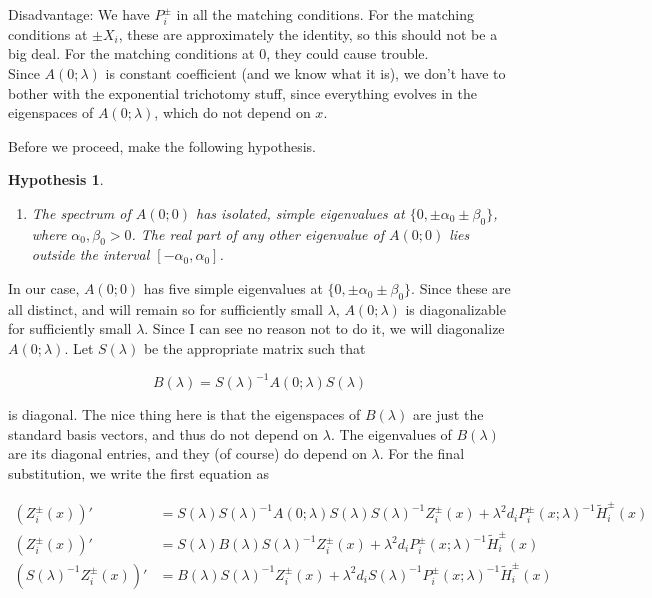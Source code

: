 \documentclass[12pt]{article}
\newtheorem{hypothesis}{Hypothesis}
\begin{document}
Disadvantage: We have $P_i^\pm$ in all the matching conditions. For the matching conditions at $\pm X_i$, these are approximately the identity, so this should not be a big deal. For the matching conditions at 0, they could cause trouble.\\

Since $A(0; \lambda)$ is constant coefficient (and we know what it is), we don't have to bother with the exponential trichotomy stuff, since everything evolves in the eigenspaces of $A(0; \lambda)$, which do not depend on $x$.

Before we proceed, make the following hypothesis.

\begin{hypothesis}\label{Aspectrumhyp}
\begin{enumerate}
	\item The spectrum of $A(0; 0)$ has isolated, simple eigenvalues at $\{ 0, \pm \alpha_0 \pm \beta_0 \}$, where $\alpha_0, \beta_0 > 0$. The real part of any other eigenvalue of $A(0; 0)$ lies outside the interval $[-\alpha_0, \alpha_0]$.
\end{enumerate}
\end{hypothesis}

In our case, $A(0; 0)$ has five simple eigenvalues at $\{ 0, \pm \alpha_0 \pm \beta_0 \}$. Since these are all distinct, and will remain so for sufficiently small $\lambda$, $A(0; \lambda)$ is diagonalizable for sufficiently small $\lambda$. Since I can see no reason not to do it, we will diagonalize $A(0; \lambda)$. Let $S(\lambda)$ be the appropriate matrix such that

\[
B(\lambda) = S(\lambda)^{-1} A(0; \lambda)S(\lambda)
\]

is diagonal. The nice thing here is that the eigenspaces of $B(\lambda)$ are just the standard basis vectors, and thus do not depend on $\lambda$. The eigenvalues of $B(\lambda)$ are its diagonal entries, and they (of course) do depend on $\lambda$. For the final substitution, we write the first equation as

\begin{align*}
(Z_i^\pm(x))' &= S(\lambda) S(\lambda)^{-1} A(0; \lambda) S(\lambda) S(\lambda)^{-1} Z_i^\pm(x) + \lambda^2 d_i P_i^\pm(x; \lambda)^{-1} \tilde{H}_i^\pm(x) \\
(Z_i^\pm(x))' &= S(\lambda) B(\lambda) S(\lambda)^{-1} Z_i^\pm(x) + \lambda^2 d_i P_i^\pm(x; \lambda)^{-1} \tilde{H}_i^\pm(x) \\
(S(\lambda)^{-1} Z_i^\pm(x))' &=  B(\lambda) S(\lambda)^{-1} Z_i^\pm(x) + \lambda^2 d_i S(\lambda)^{-1} P_i^\pm(x; \lambda)^{-1} \tilde{H}_i^\pm(x) \\
\end{align*}
\end{document}
